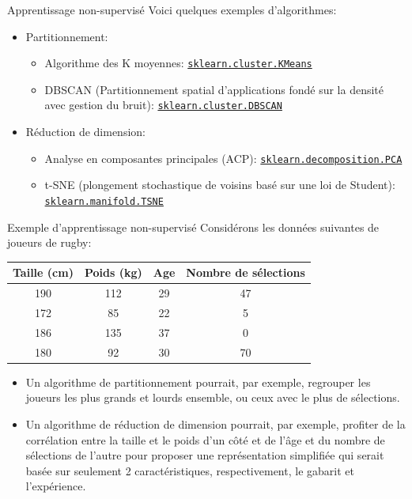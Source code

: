 \begin{frame}{Apprentissage non-supervisé}
	Voici quelques exemples d'algorithmes:
	
	\begin{itemize}
		\item Partitionnement:
		\begin{itemize}
			\item Algorithme des K moyennes: \href{https://scikit-learn.org/stable/modules/generated/sklearn.cluster.KMeans.html}{\texttt{sklearn.cluster.KMeans}}
			\item DBSCAN (Partitionnement spatial d'applications fondé sur la densité avec gestion du bruit): \href{https://scikit-learn.org/stable/modules/generated/sklearn.cluster.DBSCAN.html}{\texttt{sklearn.cluster.DBSCAN}}
		\end{itemize}
		\item Réduction de dimension:
		\begin{itemize}
			\item Analyse en composantes principales (ACP): \href{https://scikit-learn.org/stable/modules/generated/sklearn.decomposition.PCA.html}{\texttt{sklearn.decomposition.PCA}}
			\item t-SNE (plongement stochastique de voisins basé sur une loi de Student): \href{https://scikit-learn.org/stable/modules/generated/sklearn.manifold.TSNE.html}{\texttt{sklearn.manifold.TSNE}}
		\end{itemize}
	\end{itemize}
\end{frame}

\begin{frame}{Exemple d'apprentissage non-supervisé}
	Considérons les données suivantes de joueurs de rugby:
	\begin{table}
		\centering
		\begin{tabular}{|c|c|c|c|}
			\hline
			\textbf{Taille} (cm) & \textbf{Poids} (kg) & \textbf{Age} & \textbf{Nombre de sélections} \\ \hline
			190             & 112            & 29           & 47 \\
			172             & 85             & 22           & 5  \\
			186             & 135            & 37           & 0  \\
			180             & 92             & 30           & 70 \\
			\hline
		\end{tabular}
	\end{table}
	\begin{itemize}
		\item Un algorithme de partitionnement pourrait, par exemple, regrouper les joueurs les plus grands et lourds ensemble, ou ceux avec le plus de sélections.
		\item Un algorithme de réduction de dimension pourrait, par exemple, profiter de la corrélation entre la taille et le poids d'un côté et de l'âge et du nombre de sélections de l'autre pour proposer une représentation simplifiée qui serait basée sur seulement 2 caractéristiques, respectivement, le gabarit et l'expérience.
	\end{itemize}
\end{frame}

